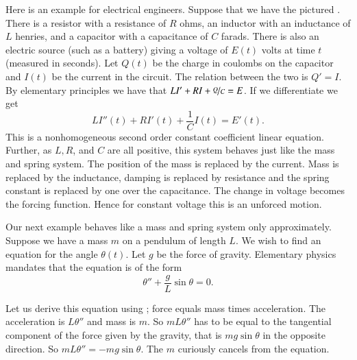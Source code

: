 \begin{mywrapfigsimp}{1.35in}{1.65in}
\diffypdfversion{\vspace*{-10pt}}
\noindent
{}
\end{mywrapfigsimp}
Here is an example for electrical engineers.  Suppose that we have the
pictured .
There is a resistor with a resistance of $R$ ohms, an
inductor with an inductance of $L$ henries,
and a capacitor with a capacitance of $C$ farads.  There is also
an electric source (such as a battery) giving a voltage of $E(t)$ volts
at time $t$ (measured in seconds).
Let $Q(t)$ be the charge in coulombs on the capacitor
and $I(t)$ be the current in the circuit.  The relation between the two is
$Q' = I$.  By elementary principles we have that
$L I' + RI + \nicefrac{Q}{C} = E$.   If we differentiate we get
\begin{equation*}
L I''(t) + R I'(t) + \frac{1}{C} I(t) = E'(t) .
\end{equation*}
This is a nonhomogeneous second order constant coefficient linear equation.
Further, as $L, R$, and $C$ are all positive, this system behaves just like the
mass and spring system.  The position of the mass is replaced by the current.
Mass is replaced by the inductance, damping is replaced by resistance and
the spring constant is replaced by one over the capacitance.  The change in
voltage becomes the forcing function.  Hence for constant voltage this is an
unforced motion.

\medskip

\begin{mywrapfigsimp}{1.46in}{1.76in}
\noindent
{}
\end{mywrapfigsimp}
Our next example behaves like a mass and spring system only
approximately. Suppose we have a
mass $m$ on a pendulum of length $L$.  We wish to find an equation for
the angle $\theta(t)$.  Let $g$ be the force of gravity.
Elementary physics mandates that the equation is
of the form
\begin{equation*}
\theta'' + \frac{g}{L} \sin \theta = 0 .
\end{equation*}

Let us derive this equation using ;
force equals mass times acceleration.  The acceleration is
$L \theta''$ and mass is $m$.  So $mL\theta''$ has to be equal
to the tangential component of the force given by the gravity, that is
$m g \sin \theta$ in the opposite direction.
So $mL\theta'' = -mg \sin \theta$.
The $m$ curiously cancels from the equation.

